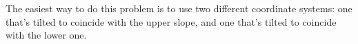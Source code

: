 The easiest way to do this problem is to use two different coordinate
systems: one that's tilted to coincide with the upper slope, and one that's
tilted to coincide with the lower one.
